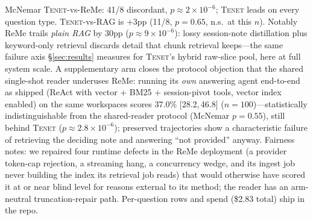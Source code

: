 \documentclass[11pt]{article}
\newcommand{\tenet}{\textsc{Tenet}}
\newcommand{\ci}[2]{{\footnotesize[#1,\,#2]}}
\begin{document}
McNemar \tenet{}-vs-ReMe: 41/8 discordant, $p\approx2\times10^{-6}$; \tenet{} leads on
every question type. \tenet{}-vs-RAG is $+3$pp (11/8, $p{=}0.65$, n.s.\ at this $n$).
Notably ReMe trails \emph{plain RAG} by 30pp ($p\approx9\times10^{-6}$): lossy
session-note distillation plus keyword-only retrieval discards detail that chunk
retrieval keeps---the same failure axis \S\ref{sec:results} measures for \tenet{}'s
hybrid raw-slice pool, here at full system scale. A supplementary arm closes the
protocol objection that the shared single-shot reader underuses ReMe: running its
\emph{own} answering agent end-to-end as shipped (ReAct with vector + BM25 +
session-pivot tools, vector index enabled) on the same workspaces scores
$37.0\%$ \ci{28.2}{46.8} ($n{=}100$)---statistically indistinguishable from the
shared-reader protocol (McNemar $p{=}0.55$), still behind \tenet{}
($p\approx2.8\times10^{-6}$); preserved trajectories show a characteristic
failure of retrieving the deciding note and answering ``not provided'' anyway. Fairness notes: we repaired four
runtime defects in the ReMe deployment (a provider token-cap rejection, a streaming
hang, a concurrency wedge, and its ingest job never building the index its retrieval
job reads) that would otherwise have scored it at or near blind level for reasons
external to its method; the reader has an arm-neutral truncation-repair path. Per-question
rows and spend (\$2.83 total) ship in the repo.
\end{document}
